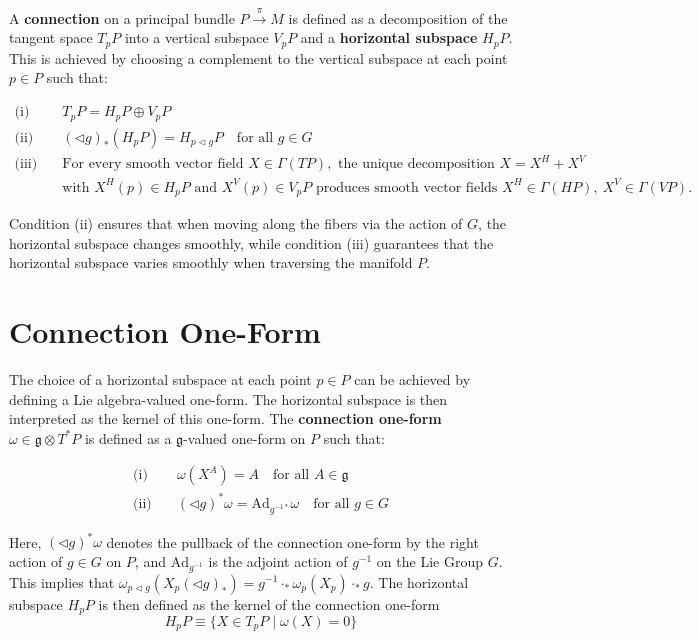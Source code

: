 A \textbf{connection} on a principal bundle \( P \xrightarrow{\pi} M \) is defined as a decomposition of the tangent space \( T_pP \) into a vertical subspace \( V_pP \) and a \textbf{horizontal subspace} \( H_pP \). This is achieved by choosing a complement to the vertical subspace at each point \( p \in P \) such that:

\begin{align*}
  \text{(i)}\quad 
    & T_pP = H_pP \oplus V_pP \\
  \text{(ii)}\quad 
    & (\triangleleft g)_* (H_pP) = H_{p \triangleleft g}P 
    \quad \text{for all } g \in G \\
  \text{(iii)}\quad 
    & \text{For every smooth vector field } X \in \Gamma(TP), \text{ the unique decomposition } 
      X = X^H + X^V \\
    & \text{with } X^H(p) \in H_pP \text{ and } X^V(p) \in V_pP \text{ produces smooth vector fields } 
      X^H \in \Gamma(HP),\ X^V \in \Gamma(VP).
\end{align*}

Condition (ii) ensures that when moving along the fibers via the action of \( G \), the horizontal subspace changes smoothly, while condition (iii) guarantees that the horizontal subspace varies smoothly when traversing the manifold \( P \).


\section{Connection One-Form}

The choice of a horizontal subspace at each point \( p \in P \) can be achieved by defining a Lie algebra-valued one-form. The horizontal subspace is then interpreted as the kernel of this one-form. The \textbf{connection one-form} \( \omega \in \mathfrak{g} \otimes T^*P \) is defined as a \( \mathfrak{g} \)-valued one-form on \( P \) such that:

\begin{align*}
  \text{(i)}\quad 
    & \omega(X^A) = A \quad \text{for all } A \in \mathfrak{g} \\
  \text{(ii)}\quad 
    & (\triangleleft g)^* \omega = \text{Ad}_{g^{-1*}} \omega \quad \text{for all } g \in G 
\end{align*}

Here, \( (\triangleleft g)^* \omega \) denotes the pullback of the connection one-form by the right action of \( g \in G \) on \( P \), and \( \text{Ad}_{g^{-1}} \) is the adjoint action of \( g^{-1} \) on the Lie Group \( G \). This implies that \( \omega_{p \triangleleft g}(X_p(\triangleleft g)_*) = g^{-1} \cdot_* \omega_p(X_p) \cdot_* g \). The horizontal subspace \( H_pP \) is then defined as the kernel of the connection one-form\cite{NakaharaGeometrytopologyphysics2005}
\[ H_pP \equiv \{ X \in T_pP \mid \omega(X)=0 \} \]


